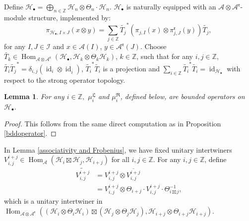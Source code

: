 \documentclass{article}
\newtheorem{lemma}{Lemma}
\newcommand{\hilb}{\mathcal{H}}
\newcommand{\A}{\mathcal{A}}
\newcommand{\Z}{\mathbb{Z}}
\begin{document}
Define $\hilb_{\bullet} = \bigoplus_{n\in\Z} \hilb_n\otimes \Theta_n\cdot\hilb_n$.
$\hilb_\bullet$ is naturally equipped with an $\A \otimes \A^\mathfrak{r}$-module structure,
implemented by: 
\[
        \pi_{\hilb_\bullet, I\times J}(x\otimes y ) =  \sum_{j\in\Z}\widetilde{T_{j}}^* (\pi_{j,I}(x) \otimes \pi_{j,J}^{\mathfrak{r}}(y))\widetilde{T_{j}},
\]
for any $I , J \in \mathcal{I}$ and $x\in\A(I)$, $y \in\A^\mathfrak{r}(J)$. 
Choose $\widetilde{T_k}\in \operatorname{Hom}_{\A\otimes\A^\mathfrak{r}}(\hilb_{\bullet}, \hilb_k\otimes\Theta_k\hilb_k)$, $k\in\Z$, such that for any $i,j\in\Z$, 
$\widetilde{T_i}\widetilde{T_j}^* = \delta_{i,j}(\operatorname{id}_i\otimes \operatorname{id}_{\overline{i}})$, $\widetilde{T_i}^*\widetilde{T_i}$ is a projection and $\sum_{i\in\Z}\widetilde{T_i}^*\widetilde{T_i} = \operatorname{id}_{\hilb_\bullet}$ with respect to the strong operator topology. 


\begin{lemma}
    For any $i\in\Z,$ $\mu_i^{\mathfrak{L}}$ and $\mu_i^{\mathfrak{R}}$, defined below,  are bounded operators on $\hilb_\bullet$.
\end{lemma}
\begin{proof}
    This follows from the same direct computation as in  Proposition \ref{bddoperator}.  
\end{proof}

In  Lemma \ref{associativity and Frobenius},
we have fixed unitary intertwiners $V_{i,j}^{i+j}\in \operatorname{Hom}_{\A}(\hilb_i \boxtimes \hilb_j, \hilb_{i+j})$  for all $i,j\in\Z$. 
For any $i, j\in\Z$, define 
\begin{align*}
  \widetilde{V^{i+j}_{i,j}} &= V^{i+j}_{i,j}\otimes \overline{V^{i+j}_{i,j}}\\
  &= V^{i+j}_{i,j} \otimes \Theta_{i+j} \cdot V^{i+j}_{i,j} \cdot \Theta^{-1}_{i\boxtimes j},
\end{align*}
 which is a unitary intertwiner in 
$\operatorname{Hom}_{\A\otimes\A^\mathfrak{r}}\left((\hilb_i\otimes\Theta_i\hilb_i)\boxtimes (\hilb_j\otimes\Theta_j\hilb_j), \hilb_{i+j}\otimes\Theta_{i+j}\hilb_{i+j}\right)$. 
\end{document}
